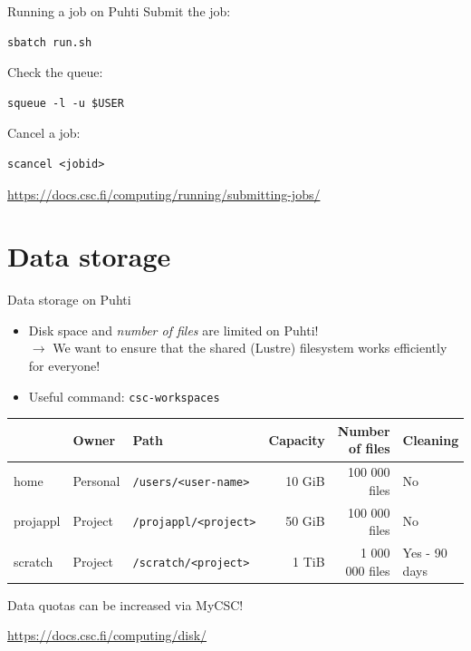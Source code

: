 \documentclass[aspectratio=1610,14pt]{beamer}
\newcommand{\link}[1]{\alert{\url{#1}}}
\begin{document}
\begin{frame}[fragile]{Running a job on Puhti}
  Submit the job:
\begin{verbatim}
sbatch run.sh
\end{verbatim}
  \vfill
  
  Check the queue:
\begin{verbatim}
squeue -l -u $USER
\end{verbatim}
  \vfill
  
  Cancel a job:
\begin{verbatim}
scancel <jobid>
\end{verbatim}

  {\small \link{https://docs.csc.fi/computing/running/submitting-jobs/}}
\end{frame}

\section{Data storage}

\begin{frame}{Data storage on Puhti}

  \begin{itemize}
  \item Disk space and \emph{number of files} are limited on Puhti! \\
    {\small $\rightarrow$ We want to ensure that the shared (Lustre) filesystem works
    efficiently for everyone!}
  \item Useful command: {\tt csc-workspaces}
  \end{itemize}

  \vfill

  {\footnotesize
    \begin{tabular}{lllrrl}
             & Owner    & Path                      & Capacity & Number of files & Cleaning \\
    \hline
    home     & Personal & {\tt /users/<user-name>}  & 10 GiB   & 100 000 files   & No \\
    projappl & Project  & {\tt /projappl/<project>} & 50 GiB   & 100 000 files   & No \\
    scratch  & Project  & {\tt /scratch/<project>}  & 1 TiB    & 1 000 000 files & Yes - 90 days \\
    \end{tabular}
  }
  \vfill
  {\small
    Data quotas can be increased via MyCSC!

    \link{https://docs.csc.fi/computing/disk/}}
\end{frame}
\end{document}
